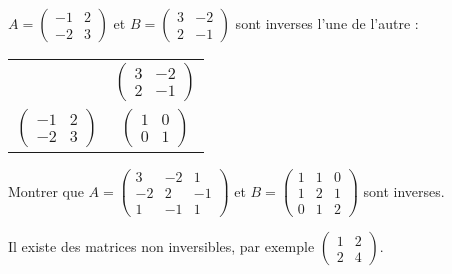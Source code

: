 \documentclass[a4paper,12pt]{book}
\begin{document}
\begin{exemple}[]
$A=\begin{pmatrix}
-1&2\\-2&3
\end{pmatrix}$ et $B=\begin{pmatrix}
3&-2\\2&-1
\end{pmatrix}$ sont inverses l'une de l'autre :
\begin{center}
\begin{tabular}{cc}
& $\begin{pmatrix}
3&-2\\2&-1
\end{pmatrix}$\\
$\begin{pmatrix}
-1&2\\-2&3
\end{pmatrix}$
 & $\begin{pmatrix}
 1&0\\0&1
 \end{pmatrix}$
\end{tabular}
\end{center}
\end{exemple}
\begin{exercice}[]
Montrer que $A=\begin{pmatrix}
3 & -2&1\\
-2&2&-1\\
1&-1&1
\end{pmatrix}$ et 
$B=\begin{pmatrix}
1& 1&0\\
1&2&1\\
0&1&2
\end{pmatrix}$ sont inverses.

\end{exercice}
\begin{remarque}[]
Il existe des matrices non inversibles, par exemple $\begin{pmatrix}
1 & 2\\ 2 & 4 
\end{pmatrix}$.
\end{remarque}
\end{document}
